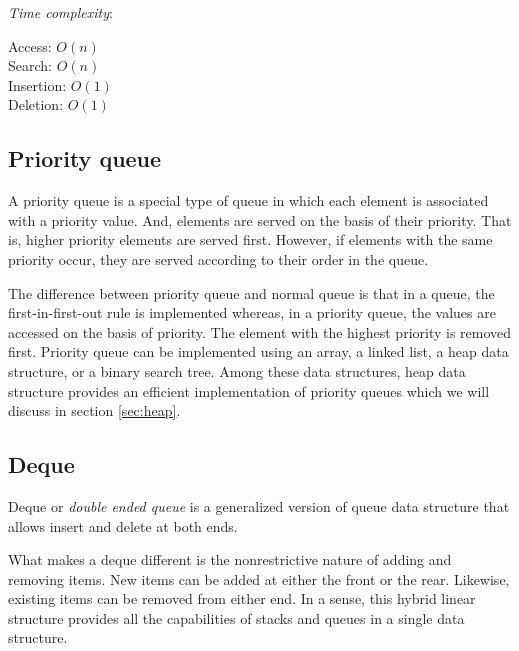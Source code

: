 \documentclass[a4paper,11pt]{book}
\begin{document}
\noindent \textit{Time complexity}:

\noindent Access: $O(n)$\\
\noindent Search: $O(n)$\\
\noindent Insertion: $O(1)$\\
\noindent Deletion: $O(1)$

\subsection{Priority queue}

\noindent A priority queue is a special type of queue in which each element is associated with a priority value. And, elements are served on the basis of their priority. That is, higher priority elements are served first. However, if elements with the same priority occur, they are served according to their order in the queue.

\noindent The difference between priority queue and normal queue is that in a queue, the first-in-first-out rule is implemented whereas, in a priority queue, the values are accessed on the basis of priority. The element with the highest priority is removed first. Priority queue can be implemented using an array, a linked list, a heap data structure, or a binary search tree. Among these data structures, heap data structure provides an efficient implementation of priority queues which we will discuss in section \ref{sec:heap}.

\subsection{Deque}
\noindent Deque or \textit{double ended queue} is a generalized version of queue data structure that allows insert and delete at both ends.

\noindent What makes a deque different is the nonrestrictive nature of adding and removing items. New items can be added at either the front or the rear. Likewise, existing items can be removed from either end. In a sense, this hybrid linear structure provides all the capabilities of stacks and queues in a single data structure.\\
\end{document}
